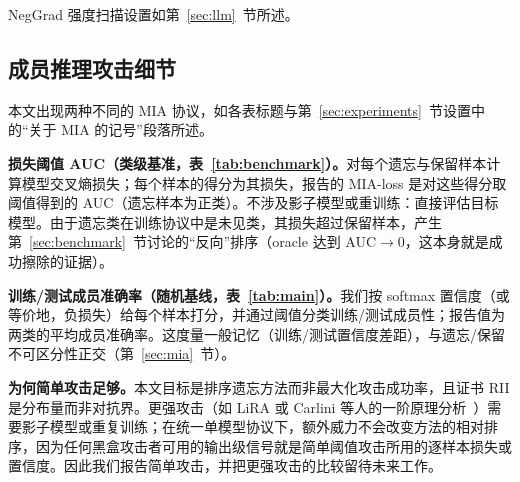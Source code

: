 NegGrad 强度扫描设置如第~\ref{sec:llm}~节所述。

\subsection{成员推理攻击细节}
\label{app:mia}

本文出现两种不同的 MIA 协议，如各表标题与第~\ref{sec:experiments}~节设置中的``关于 MIA 的记号''段落所述。

\textbf{损失阈值 AUC（类级基准，表~\ref{tab:benchmark}）。}对每个遗忘与保留样本计算模型交叉熵损失；每个样本的得分为其损失，报告的 MIA-loss 是对这些得分取阈值得到的 AUC（遗忘样本为正类）。不涉及影子模型或重训练：直接评估目标模型。由于遗忘类在训练协议中是未见类，其损失超过保留样本，产生第~\ref{sec:benchmark}~节讨论的``反向''排序（oracle 达到 AUC${\to}0$，这本身就是成功擦除的证据）。

\textbf{训练/测试成员准确率（随机基线，表~\ref{tab:main}）。}我们按 softmax 置信度（或等价地，负损失）给每个样本打分，并通过阈值分类训练/测试成员性；报告值为两类的平均成员准确率。这度量一般记忆（训练/测试置信度差距），与遗忘/保留不可区分性正交（第~\ref{sec:mia}~节）。

\textbf{为何简单攻击足够。}本文目标是排序遗忘方法而非最大化攻击成功率，且证书 RII 是分布量而非对抗界。更强攻击（如 LiRA 或 Carlini 等人的一阶原理分析~\cite{carlini2022membership}）需要影子模型或重复训练；在统一单模型协议下，额外威力不会改变方法的相对排序，因为任何黑盒攻击者可用的输出级信号就是简单阈值攻击所用的逐样本损失或置信度。因此我们报告简单攻击，并把更强攻击的比较留待未来工作。

